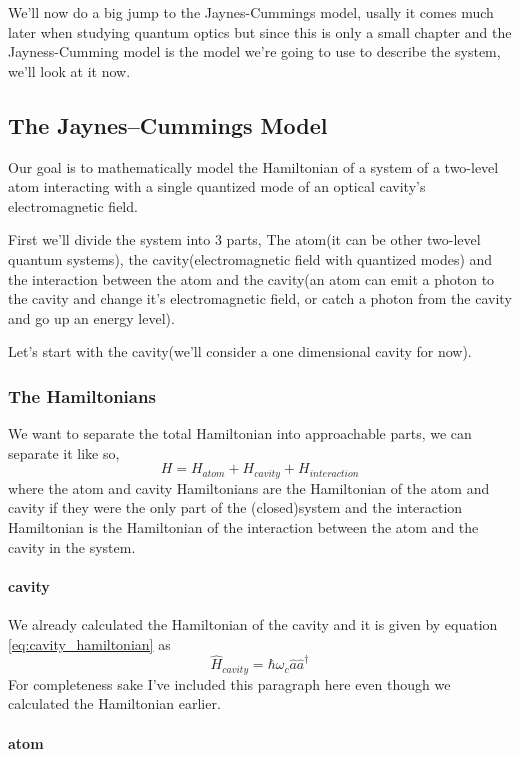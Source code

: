 \documentclass[english, a4paper, 12pt, twoside]{article}
\numberwithin{equation}{section} %
\begin{document}
We'll now do a big jump to the Jaynes-Cummings model, usally it comes much later when studying quantum optics but since this is only a small chapter and the Jayness-Cumming model is the model we're going to use to describe the system, we'll look at it now.
\subsection{The Jaynes–Cummings Model}
Our goal is to mathematically model the Hamiltonian of a system of a two-level atom interacting with a single quantized mode of an optical cavity's electromagnetic field. %
\par
First we'll divide the system into 3 parts, The atom(it can be other two-level quantum systems), the cavity(electromagnetic field with quantized modes) and the interaction between the atom and the cavity(an atom can emit a photon to the cavity and change it's electromagnetic field, or catch a photon from the cavity and go up an energy level).\par  %

Let's start with the cavity(we'll consider a one dimensional cavity for now).
\subsubsection{The Hamiltonians}
We want to separate the total Hamiltonian into approachable parts, we can separate it like so,
\[
    H = H_{atom} + H_{cavity} + H_{interaction}
\]
where the atom and cavity Hamiltonians are the Hamiltonian of the atom and cavity if they were the only part of the (closed)system and the interaction Hamiltonian is the Hamiltonian of the interaction between the atom and the cavity in the system.

\paragraph*{cavity}
We already calculated the Hamiltonian of the cavity and it is given by equation \ref{eq:cavity_hamiltonian} as
\begin{equation}
    \boxed{\hat{H}_{cavity} = \hbar\omega_c\hat{a}\hat{a}^\dag}
\end{equation}
For completeness sake I've included this paragraph here even though we calculated the Hamiltonian earlier.

\paragraph*{atom}
\end{document}
